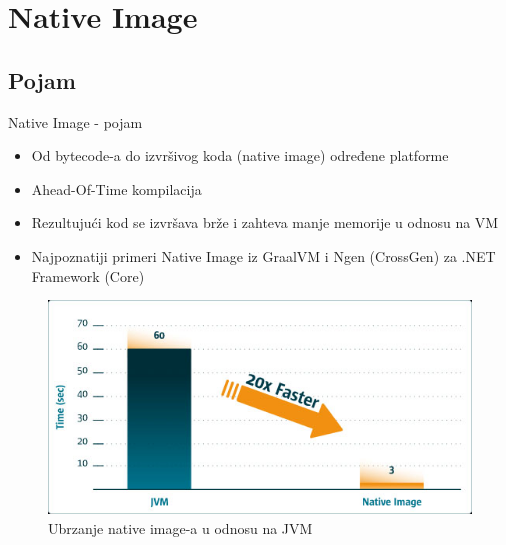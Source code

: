 \documentclass[compress, containsverbatim,mathserif, xcolor=dvipsnames, unicode]{beamer}
\begin{document}
\section{Native Image}
\subsection{Pojam}
\begin{frame}{Native Image - pojam}
    \begin{itemize}
        \item Od bytecode-a do izvršivog koda (native image) određene platforme
        \item Ahead-Of-Time kompilacija
        \item Rezultujući kod se izvršava brže i zahteva manje memorije u odnosu na VM
        \item Najpoznatiji primeri Native Image iz GraalVM i Ngen (CrossGen) za .NET Framework (Core)            
    \end{itemize} 
    \vspace{1em}
    \begin{figure}[h!]
        \begin{center}
            \includegraphics[scale = 0.25]{../pics/alibaba_pic.jpg}
        \end{center}
        \caption{Ubrzanje native image-a u odnosu na JVM}
    \end{figure} 
\end{frame}
\end{document}
